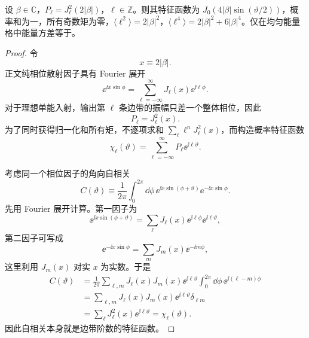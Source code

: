 \begin{lemma}
设 $\beta\in\mathbb C$，$P_\ell=J_\ell^2(2|\beta|)$，$\ell\in\mathbb Z$。则其特征函数为 $J_0(4|\beta|\sin(\vartheta/2))$，概率和为一，所有奇数矩为零，$\langle\ell^2\rangle=2|\beta|^2$，$\langle\ell^4\rangle=2|\beta|^2+6|\beta|^4$。仅在均匀能量格中能量方差等于。
\end{lemma}
\begin{proof}
令
\begin{equation*}
 x\equiv2|\beta|.
\end{equation*}
正文纯相位散射因子具有 Fourier 展开
\begin{equation*}
 \ee^{\ii x\sin\phi}
 =\sum_{\ell=-\infty}^{\infty}
 J_\ell(x)\ee^{\ii\ell\phi}.
\end{equation*}
对于理想单能入射，输出第 $\ell$ 条边带的振幅只差一个整体相位，因此
\begin{equation*}
 P_\ell=J_\ell^2(x).
\end{equation*}
为了同时获得归一化和所有矩，不逐项求和 $\sum_\ell \ell^nJ_\ell^2(x)$，而构造概率特征函数
\begin{equation*}
 \chi_\ell(\vartheta)
 =\sum_{\ell=-\infty}^{\infty}
 P_\ell \ee^{\ii\ell\vartheta}.
\end{equation*}

考虑同一个相位因子的角向自相关
\begin{equation*}
 C(\vartheta)
 \equiv\frac1{2\pi}
 \int_0^{2\pi}\dd\phi\,
 \ee^{\ii x\sin(\phi+\vartheta)}
 \ee^{-\ii x\sin\phi}.
\end{equation*}
先用 Fourier 展开计算。第一因子为
\begin{equation*}
 \ee^{\ii x\sin(\phi+\vartheta)}
 =\sum_{\ell}J_\ell(x)
 \ee^{\ii\ell\phi}\ee^{\ii\ell\vartheta},
\end{equation*}
第二因子可写成
\begin{equation*}
 \ee^{-\ii x\sin\phi}
 =\sum_mJ_m(x)\ee^{-\ii m\phi},
\end{equation*}
这里利用 $J_m(x)$ 对实 $x$ 为实数。于是
\begin{align*}
 C(\vartheta)
 &=\frac1{2\pi}
 \sum_{\ell,m}J_\ell(x)J_m(x)\ee^{\ii\ell\vartheta}
 \int_0^{2\pi}\dd\phi\,
 \ee^{\ii(\ell-m)\phi}\\
 &=\sum_{\ell,m}J_\ell(x)J_m(x)\ee^{\ii\ell\vartheta}
 \delta_{\ell m}\\
 &=\sum_\ell J_\ell^2(x)\ee^{\ii\ell\vartheta}
 =\chi_\ell(\vartheta).
\end{align*}
因此自相关本身就是边带阶数的特征函数。


\end{proof}
